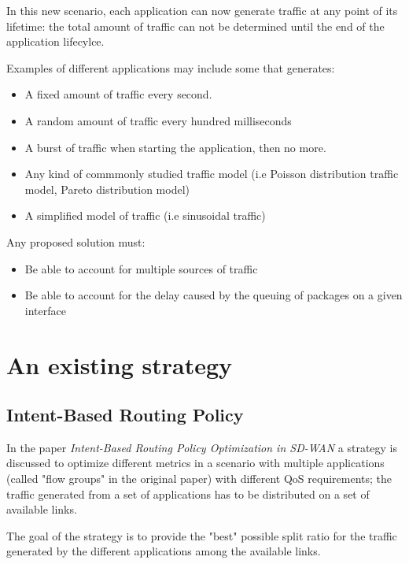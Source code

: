 	In this new scenario, each application can now generate traffic at any point of its lifetime: the total amount of traffic can not be determined until the end of the application lifecylce.
	
	Examples of different applications may include some that generates:
	\begin{itemize}
		\item A fixed amount of traffic every second.
		\item A random amount of traffic every hundred milliseconds
		\item A burst of traffic when starting the application, then no more.
		\item Any kind of commmonly studied traffic model (i.e Poisson distribution traffic model, Pareto distribution model)
		\item A simplified model of traffic (i.e sinusoidal traffic)
	\end{itemize}

	Any proposed solution must: 
	
	\begin{itemize}
		\item Be able to account for multiple sources of traffic
		\item Be able to account for the delay caused by the queuing of packages on a given interface
	\end{itemize}
	
	
	
	\section{An existing strategy}
	
	
	\subsection{Intent-Based Routing Policy}
	

	In the paper \textit{Intent-Based Routing Policy Optimization in SD-WAN} \cite{intent_based_routing} a strategy is discussed to optimize different metrics in a scenario with multiple applications (called "flow groups" in the original paper) with different QoS requirements; the traffic generated from a set of applications has to be distributed on a set of available links.
	
	The goal of the strategy is to provide the "best" possible split ratio for the traffic generated by the different applications among the available links.
	

